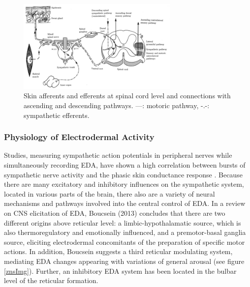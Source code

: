 \begin{figure}[ht]
\centering
\includegraphics[width=0.7\textwidth]{images/symPathway.png}
\caption{Skin afferents and efferents at spinal cord level and connections with ascending and descending pathways. ---: motoric pathway, -.-: sympathetic efferents. }
\label{symPathImg}
\end{figure}

\subsubsection{Physiology of Electrodermal Activity}
Studies, measuring sympathetic action potentials in peripheral nerves while simultaneously recording EDA, have shown a high correlation between bursts of sympathetic nerve activity and the phasic skin conductance response \cite{HANDBOOKPP}. Because there are many excitatory and inhibitory influences on the sympathetic system, located in various parts of the brain, there also are a variety of neural mechanisms and pathways involved into the central control of EDA.
In a review on CNS elicitation of EDA, Boucsein (2013) concludes that there are two different origins above reticular level: a limbic-hypothalamatic source, which is also thermoregulatory and emotionally influenced, and a premotor-basal ganglia source, eliciting electrodermal concomitants of the preparation of specific motor actions. In addition, Boucsein suggests a third reticular modulating system, mediating EDA changes appearing with variations of general arousal (see figure \ref{znsImg}). Further, an inhibitory EDA system has been located in the bulbar level of the reticular formation.

